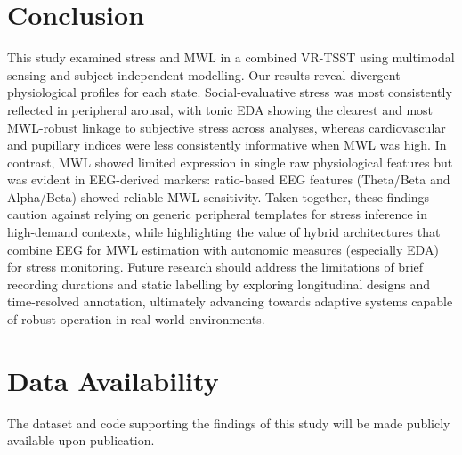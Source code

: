 \documentclass[lettersize,journal]{IEEEtran}
\begin{document}
\section{Conclusion}
This study examined stress and MWL in a combined VR-TSST using multimodal sensing and subject-independent modelling. Our results reveal divergent physiological profiles for each state. Social-evaluative stress was most consistently reflected in peripheral arousal, with tonic EDA showing the clearest and most MWL-robust linkage to subjective stress across analyses, whereas cardiovascular and pupillary indices were less consistently informative when MWL was high. In contrast, MWL showed limited expression in single raw physiological features but was evident in EEG-derived markers: ratio-based EEG features (Theta/Beta and Alpha/Beta) showed reliable MWL sensitivity. Taken together, these findings caution against relying on generic peripheral templates for stress inference in high-demand contexts, while highlighting the value of hybrid architectures that combine EEG for MWL estimation with autonomic measures (especially EDA) for stress monitoring. Future research should address the limitations of brief recording durations and static labelling by exploring longitudinal designs and time-resolved annotation, ultimately advancing towards adaptive systems capable of robust operation in real-world environments.

\section*{Data Availability}
The dataset and code supporting the findings of this study will be made publicly available upon publication.






\newpage






\vfill
\end{document}
